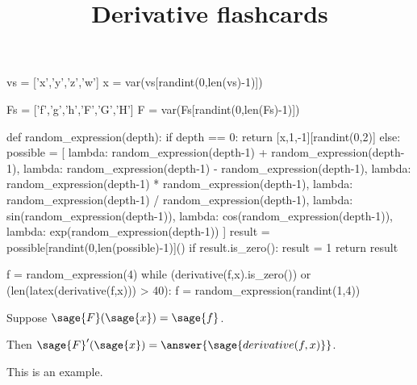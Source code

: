 \documentclass{ximera}
\title{Derivative flashcards}
\begin{document}
\begin{sagesilent}
  vs = ['x','y','z','w']
  x = var(vs[randint(0,len(vs)-1)])

  Fs = ['f','g','h','F','G','H']
  F = var(Fs[randint(0,len(Fs)-1)])
  
  def random_expression(depth):
    if depth == 0:
      return [x,1,-1][randint(0,2)]
    else:
      possible = [
        lambda: random_expression(depth-1) + random_expression(depth-1),
        lambda: random_expression(depth-1) - random_expression(depth-1),
        lambda: random_expression(depth-1) * random_expression(depth-1),
        lambda: random_expression(depth-1) / random_expression(depth-1),
        lambda: sin(random_expression(depth-1)),
        lambda: cos(random_expression(depth-1)),
        lambda: exp(random_expression(depth-1))
      ]
      result = possible[randint(0,len(possible)-1)]()
      if result.is_zero():
        result = 1
      return result

  f = random_expression(4)
  while (derivative(f,x).is_zero()) or (len(latex(derivative(f,x))) > 40):
    f = random_expression(randint(1,4))
\end{sagesilent}

\begin{exercise}

  Suppose $\sage{F}(\sage{x}) = \sage{f}$.

  Then $\sage{F}'(\sage{x}) = \answer{\sage{derivative(f,x)}}$.

\end{exercise}

\begin{example}
  This is an example.
\end{example}
\end{document}
